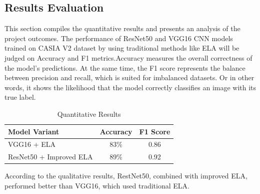 \documentclass{ieeeaccess}
\begin{document}
 \subsection{Results Evaluation}
  This section compiles the quantitative results and presents an analysis of the project outcomes. The performance of ResNet50 and VGG16 CNN models trained on CASIA V2 dataset by using traditional methods like ELA will be judged on Accuracy and F1 metrics.Accuracy measures the overall correctness of the model's predictions. At the same time, the F1 score represents the balance between precision and recall, which is suited for imbalanced datasets. Or in other words, it shows the likelihood that the model correctly classifies an image with its true label.
  \begin{table}[h!]
  	\centering
  	\begin{tabular}{@{}lcc@{}}
  		\toprule
  		\textbf{Model Variant}           & \textbf{Accuracy} & \textbf{F1 Score} \\ \midrule
  		VGG16 + ELA                      & 83\%              & 0.86              \\
  		ResNet50 + Improved ELA          & 89\%              & 0.92              \\ \bottomrule
  	\end{tabular}
  	\caption{Quantitative Results}
  	\label{tab:quantitative-results}
  \end{table}
  
  According to the qualitative results, RestNet50, combined with improved ELA, performed better than VGG16, which used traditional ELA.
  
\end{document}
